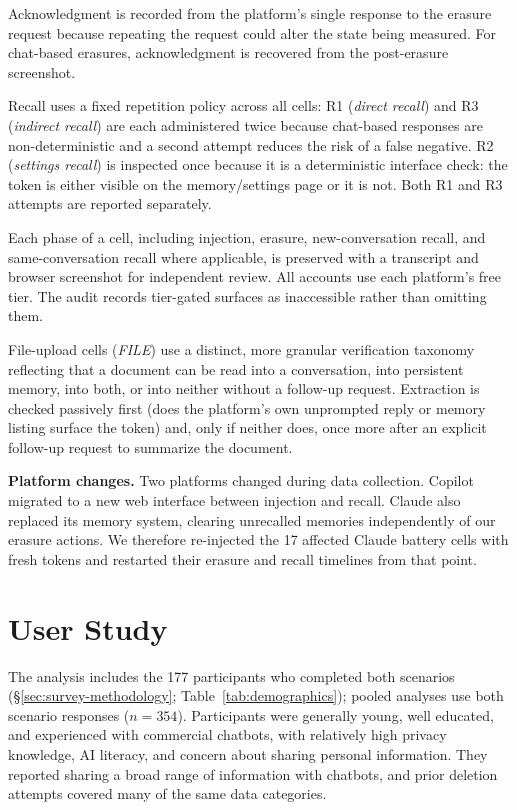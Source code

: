 \documentclass[conference,compsoc]{IEEEtran}
\begin{document}
Acknowledgment is recorded from the platform's single response to the erasure request because repeating the request could alter the state being measured. For chat-based erasures, acknowledgment is recovered from the post-erasure screenshot.

Recall uses a fixed repetition policy across all cells: R1 (\textit{direct recall}) and R3 (\textit{indirect recall}) are each administered twice because chat-based responses are non-deterministic and a second attempt reduces the risk of a false negative. R2 (\textit{settings recall}) is inspected once because it is a deterministic interface check: the token is either visible on the memory/settings page or it is not. Both R1 and R3 attempts are reported separately.

Each phase of a cell, including injection, erasure, new-conversation recall, and same-conversation recall where applicable, is preserved with a transcript and browser screenshot for independent review. All accounts use each platform's free tier. The audit records tier-gated surfaces as inaccessible rather than omitting them.

File-upload cells (\textit{FILE})
use a distinct, more granular verification taxonomy reflecting that a
document can be read into a conversation, into persistent memory, into
both, or into neither without a follow-up request. Extraction is
checked passively first (does the platform's own unprompted reply or
memory listing surface the token) and, only if neither does, once more
after an explicit follow-up request to summarize the document.

\textbf{Platform changes.} Two platforms changed during data collection. Copilot migrated to a new web interface between injection and recall. Claude also replaced its memory system, clearing unrecalled memories independently of our erasure actions. We therefore re-injected the 17 affected Claude battery cells with fresh tokens and restarted their erasure and recall timelines from that point.

\section{User Study}

\label{sec:sample-knowledge}

The analysis includes the 177 participants who completed both scenarios (\S\ref{sec:survey-methodology}; Table~\ref{tab:demographics}); pooled analyses use both scenario responses ($n=354$). Participants were generally young, well educated, and experienced with commercial chatbots, with relatively high privacy knowledge, AI literacy, and concern about sharing personal information. They reported sharing a broad range of information with chatbots, and prior deletion attempts covered many of the same data categories.
\end{document}
